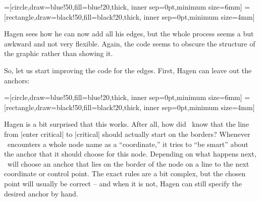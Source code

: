 {
=[circle,draw=blue!50,fill=blue!20,thick,
                   inner sep=0pt,minimum size=6mm]
=[rectangle,draw=black!50,fill=black!20,thick,
                        inner sep=0pt,minimum size=4mm]
\begin{codeexample}[]
\end{codeexample}
}

Hagen sees how he can now add all his edges, but the whole process
seems a but awkward and not very flexible. Again, the code seems to
obscure the structure of the graphic rather than showing it.

So, let us start improving the code for the edges. First, Hagen can
leave out the anchors:

{
=[circle,draw=blue!50,fill=blue!20,thick,
                   inner sep=0pt,minimum size=6mm]
=[rectangle,draw=black!50,fill=black!20,thick,
                        inner sep=0pt,minimum size=4mm]
\begin{codeexample}[]
\end{codeexample}
}

Hagen is a bit surprised that this works. After all, how did
\tikzname\ know that the line from |enter critical| to |critical|
should actually start on the borders? Whenever \tikzname\ encounters a
whole node name as a ``coordinate,'' it tries to ``be smart'' about
the anchor that it should choose for this node. Depending on what
happens next, \tikzname\ will choose an anchor that lies on the border
of the node on a line to the next coordinate or control point. The
exact rules are a bit complex, but the chosen point will usually be
correct -- and when it is not, Hagen can still specify the desired
anchor by hand.

